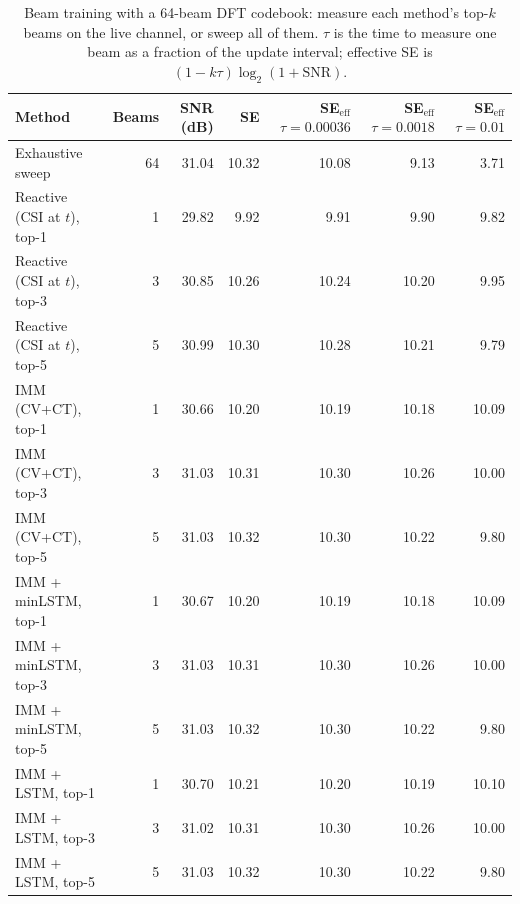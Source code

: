 \begin{table}[t]
\centering
\caption{Beam training with a 64-beam DFT codebook: measure each method's top-$k$ beams on the live channel, or sweep all of them. $\tau$ is the time to measure one beam as a fraction of the update interval; effective SE is $(1-k\tau)\log_2(1+\mathrm{SNR})$.}\label{tab:training64}
\begin{tabular}{lrrrrrr}
\toprule
Method & Beams & SNR (dB) & SE & SE$_{\mathrm{eff}}$ $\tau{=}0.00036$ & SE$_{\mathrm{eff}}$ $\tau{=}0.0018$ & SE$_{\mathrm{eff}}$ $\tau{=}0.01$ \\
\midrule
Exhaustive sweep & 64 & 31.04 & 10.32 & 10.08 & 9.13 & 3.71 \\
Reactive (CSI at $t$), top-1 & 1 & 29.82 & 9.92 & 9.91 & 9.90 & 9.82 \\
Reactive (CSI at $t$), top-3 & 3 & 30.85 & 10.26 & 10.24 & 10.20 & 9.95 \\
Reactive (CSI at $t$), top-5 & 5 & 30.99 & 10.30 & 10.28 & 10.21 & 9.79 \\
IMM (CV+CT), top-1 & 1 & 30.66 & 10.20 & 10.19 & 10.18 & 10.09 \\
IMM (CV+CT), top-3 & 3 & 31.03 & 10.31 & 10.30 & 10.26 & 10.00 \\
IMM (CV+CT), top-5 & 5 & 31.03 & 10.32 & 10.30 & 10.22 & 9.80 \\
IMM + minLSTM, top-1 & 1 & 30.67 & 10.20 & 10.19 & 10.18 & 10.09 \\
IMM + minLSTM, top-3 & 3 & 31.03 & 10.31 & 10.30 & 10.26 & 10.00 \\
IMM + minLSTM, top-5 & 5 & 31.03 & 10.32 & 10.30 & 10.22 & 9.80 \\
IMM + LSTM, top-1 & 1 & 30.70 & 10.21 & 10.20 & 10.19 & 10.10 \\
IMM + LSTM, top-3 & 3 & 31.02 & 10.31 & 10.30 & 10.26 & 10.00 \\
IMM + LSTM, top-5 & 5 & 31.03 & 10.32 & 10.30 & 10.22 & 9.80 \\
\bottomrule
\end{tabular}
\end{table}
